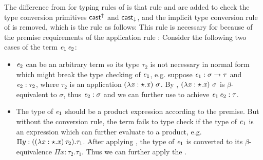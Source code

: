 The difference from \cc for typing rules of \expcc is that rule  and  are added to check the type conversion primitives $ \mathsf{cast}^{\uparrow} $ and $ \mathsf{cast}_{\downarrow} $, and the implicit type conversion rule of \cc is removed, which is the rule as follows:
\ottusedrule{\ottdruleTccXXConv{}}
This rule is necessary for \cc because of the premise requirements of the application rule :
\ottusedrule{\ottdruleTXXApp{}}
Consider the following two cases of the term $\mathit{e_{{\mathrm{1}}}} \, \mathit{e_{{\mathrm{2}}}}$:
\begin{itemize}
\item $\mathit{e_{{\mathrm{2}}}}$ can be an arbitrary term so its type $\tau_{{\mathrm{2}}}$ is not necessary in normal form which might break the type checking of $\mathit{e_{{\mathrm{1}}}}$, e.g. suppose $\mathit{e_{{\mathrm{1}}}}:\sigma  \rightarrow  \tau$ and $\mathit{e_{{\mathrm{2}}}} : \tau_{{\mathrm{2}}}$, where $\tau_{{\mathrm{2}}}$ is an application $(\lambda  \mathit{x}  :  \star  .  \mathit{x})~\sigma$. By , $(\lambda  \mathit{x}  :  \star  .  \mathit{x})~\sigma$ is $\beta$-equivalent to $\sigma$, thus $\mathit{e_{{\mathrm{2}}}} : \sigma$ and we can further use  to achieve $\mathit{e_{{\mathrm{1}}}} \, \mathit{e_{{\mathrm{2}}}} : \tau$.
\item The type of $\mathit{e_{{\mathrm{1}}}}$ should be a product expression according to the premise. But without the conversion rule, the term fails to type check if the type of $\mathit{e_{{\mathrm{1}}}}$ is an expression which can further evaluate to a product, e.g. $ \Pi  y:((  \lambda  \mathit{x}  :  \star  .  \mathit{x}  ) \, \tau_{{\mathrm{2}}}).\tau_{{\mathrm{1}}}$. After applying , the type of $\mathit{e_{{\mathrm{1}}}}$ is converted to its $\beta$-equivalence $ \Pi  x:\tau_{{\mathrm{2}}}.\tau_{{\mathrm{1}}}$. Thus we can further apply the .
\end{itemize}

